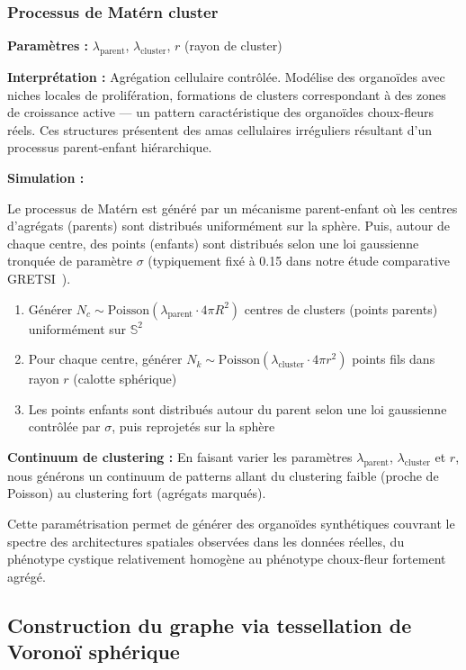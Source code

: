 \subsubsection{Processus de Matérn cluster}

\textbf{Paramètres :} $\lambda_{\text{parent}}$, $\lambda_{\text{cluster}}$, $r$ (rayon de cluster)

\textbf{Interprétation :} Agrégation cellulaire contrôlée. Modélise des organoïdes avec niches locales de prolifération, formations de clusters correspondant à des zones de croissance active — un pattern caractéristique des organoïdes choux-fleurs réels. Ces structures présentent des amas cellulaires irréguliers résultant d'un processus parent-enfant hiérarchique.

\textbf{Simulation :}

Le processus de Matérn est généré par un mécanisme parent-enfant où les centres d'agrégats (parents) sont distribués uniformément sur la sphère. Puis, autour de chaque centre, des points (enfants) sont distribués selon une loi gaussienne tronquée de paramètre $\sigma$ (typiquement fixé à 0.15 dans notre étude comparative GRETSI~\cite{Martin2025GRETSI2}).

\begin{enumerate}
    \item Générer $N_c \sim \text{Poisson}(\lambda_{\text{parent}} \cdot 4\pi R^2)$ centres de clusters (points parents) uniformément sur $\mathbb{S}^2$
    \item Pour chaque centre, générer $N_k \sim \text{Poisson}(\lambda_{\text{cluster}} \cdot 4\pi r^2)$ points fils dans rayon $r$ (calotte sphérique)
    \item Les points enfants sont distribués autour du parent selon une loi gaussienne contrôlée par $\sigma$, puis reprojetés sur la sphère
\end{enumerate}

\textbf{Continuum de clustering :}
En faisant varier les paramètres $\lambda_{\text{parent}}$, $\lambda_{\text{cluster}}$ et $r$, nous générons un continuum de patterns allant du clustering faible (proche de Poisson) au clustering fort (agrégats marqués).

Cette paramétrisation permet de générer des organoïdes synthétiques couvrant le spectre des architectures spatiales observées dans les données réelles, du phénotype cystique relativement homogène au phénotype choux-fleur fortement agrégé.

\subsection{Construction du graphe via tessellation de Voronoï sphérique}

